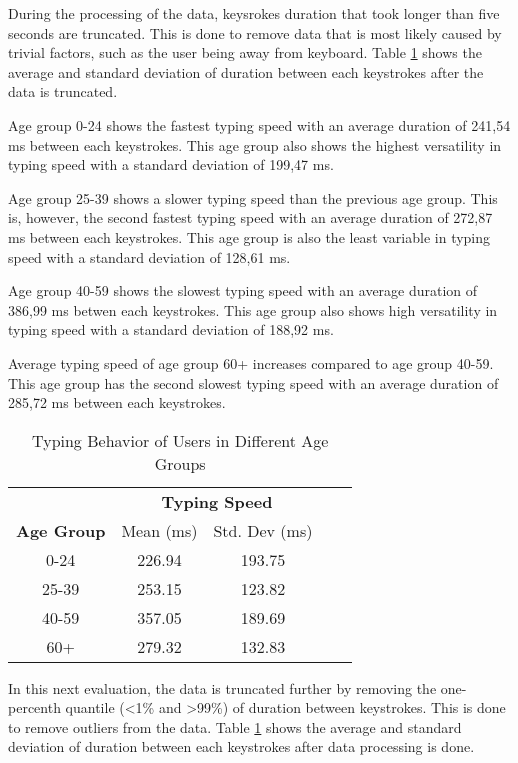 During the processing of the data, keysrokes duration that took longer than five seconds are truncated.
This is done to remove data that is most likely caused by trivial factors, such as the user being away from keyboard.
Table \ref{tab:typing_behavior_one} shows the average and standard deviation of duration between each keystrokes after the data is truncated.

Age group 0-24 shows the fastest typing speed with an average duration of 241,54 ms between each keystrokes.
This age group also shows the highest versatility in typing speed with a standard deviation of 199,47 ms.

Age group 25-39 shows a slower typing speed than the previous age group.
This is, however, the second fastest typing speed with an average duration of 272,87 ms between each keystrokes.
This age group is also the least variable in typing speed with a standard deviation of 128,61 ms.

Age group 40-59 shows the slowest typing speed with an average duration of 386,99 ms betwen each keystrokes.
This age group also shows high versatility in typing speed with a standard deviation of 188,92 ms.

Average typing speed of age group 60+ increases compared to age group 40-59.
This age group has the second slowest typing speed with an average duration of 285,72 ms between each keystrokes.

\begin{table}[h]
    \centering
    \begin{tabular}{ccccc}
    \toprule
    \multicolumn{1}{c}{} & \multicolumn{2}{c}{\textbf{Typing Speed}}\\
    \cmidrule(rl){2-3} \cmidrule(rl){4-5}
    \textbf{Age Group} & {Mean (ms)} & {Std. Dev (ms)} \\
    \midrule
    0-24 & 226.94 & 193.75 \\
    25-39 & 253.15 & 123.82  \\
    40-59 & 357.05 & 189.69 \\
    60+ & 279.32 & 132.83 \\
    \bottomrule
    \end{tabular}
    \caption{Typing Behavior of Users in Different Age Groups}
    \label{tab:typing_behavior_one}
\end{table}

In this next evaluation, the data is truncated further by removing the one-percenth quantile (\textless1\% and \textgreater99\%) of duration between keystrokes.
This is done to remove outliers from the data.
Table \ref{tab:typing_behavior_one} shows the average and standard deviation of duration between each keystrokes after data processing is done.

